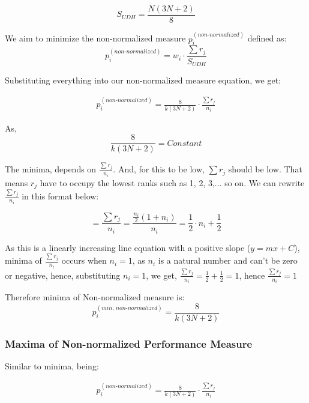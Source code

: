\documentclass[a4paper,fleqn,review]{cas-sc}
\begin{document}
\begin{equation}
	\label{eq:even-SUDH}
	S_{UDH} = \frac{N(3N + 2)}{8}
\end{equation}


We aim to minimize the non-normalized measure $p_i^{(non\text{-}normalized)}$ defined as:
\begin{equation}
	p_i^{(non\text{-}normalized)} = w_i \cdot \frac{\sum r_j}{ S_{UDH} }
\end{equation}

Substituting everything into our non-normalized measure equation, we get:

\begin{align*}
	p_i^{(non\text{-}normalized)} = \frac{8}{k(3N + 2)}\cdot \frac{\sum r_j}{n_i}
\end{align*}

As, 
\begin{equation}
	\frac{8}{k(3N + 2)} = Constant
\end{equation}

The minima, depends on $\frac{\sum r_j}{n_i}$. And, for this to be low, $\sum r_j$ should be low. That means $r_j$ have to occupy the lowest ranks such as 1, 2, 3,... so on. We can rewrite $\frac{\sum r_j}{n_i}$ in this format below:

\begin{equation}
	 = \frac{\sum r_j}{n_i} = \frac{\frac{n_i}{2}(1+n_i)}{n_i} = \frac{1}{2} \cdot n_i + \frac{1}{2}
\end{equation}

As this is a linearly increasing line equation with a positive slope ($y = mx + C$), minima of $\frac{\sum r_j}{n_i}$ occurs when $n_i = 1$, as $n_i$ is a natural number and can't be zero or negative, hence, substituting $n_i = 1$, we get, $\frac{\sum r_j}{n_i} = \frac{1}{2} + \frac{1}{2} = 1$, hence  $\frac{\sum r_j}{n_i} = 1 $

Therefore minima of Non-normalized measure is:
\begin{equation}
	\label{eq:minima}
	p_i^{(min, \, non\text{-}normalized)} = \frac{8}{k(3N + 2)}
\end{equation}

\subsubsection{Maxima of Non-normalized Performance Measure}
Similar to minima, being:

\begin{align*}
	p_i^{(non\text{-}normalized)} = \frac{8}{k(3N + 2)}\cdot \frac{\sum r_j}{n_i}
\end{align*}
\end{document}
